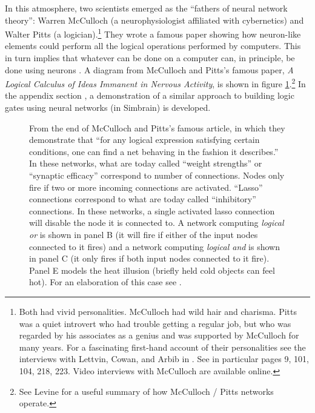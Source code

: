 In this atmosphere, two scientists emerged as the ``fathers of neural network theory'': Warren McCulloch (a neurophysiologist affiliated with cybernetics) and Walter Pitts (a logician).\footnote{Both had vivid personalities. McCulloch had wild hair and charisma. Pitts was a quiet introvert who had trouble getting a regular job, but who was regarded by his associates as a genius and was supported by McCulloch for many years. For a fascinating first-hand account of their personalities see the interviews with Lettvin, Cowan, and Arbib in \cite{anderson2000talking}. See in particular pages 9, 101, 104, 218, 223. Video interviews with McCulloch are available online.}  They wrote a famous paper  showing how neuron-like elements could perform all the logical operations performed by computers. This in turn implies that whatever can be done on a computer can, in principle, be done using neurons \cite{mcculloch1943logical}. A diagram from McCulloch and Pitts's famous paper, \emph{A Logical Calculus of Ideas Immanent in Nervous Activity}, is shown in figure \ref{mp}.\footnote{See Levine \cite[p.~12]{levine2000introduction} for a useful summary of how McCulloch / Pitts networks operate.}  In the appendix section , a demonstration of a similar approach to building logic gates using neural networks (in Simbrain) is developed.

\begin{figure}[h]
\centering
{}
\caption[From \cite{mcculloch1943logical}.]{From the end of McCulloch and Pitts's famous article, in which they demonstrate that ``for any logical expression satisfying certain conditions, one can find a net behaving in the fashion it describes.''  In these networks, what are today called ``weight strengths'' or ``synaptic efficacy'' correspond to number of connections. Nodes only fire if two or more incoming connections are activated. ``Lasso'' connections correspond to what are today called ``inhibitory'' connections. In these networks, a single activated lasso connection will disable the node it is connected to. A network computing \emph{logical or} is shown in panel B (it will fire if either of the input nodes connected to it fires) and a network computing \emph{logical and} is shown in panel C (it only fires if both input nodes connected to it fire). Panel E models the heat illusion (briefly held cold objects can feel hot). For an elaboration of this case see \cite{piccinini2004first}.}
\label{mp}
\end{figure}

